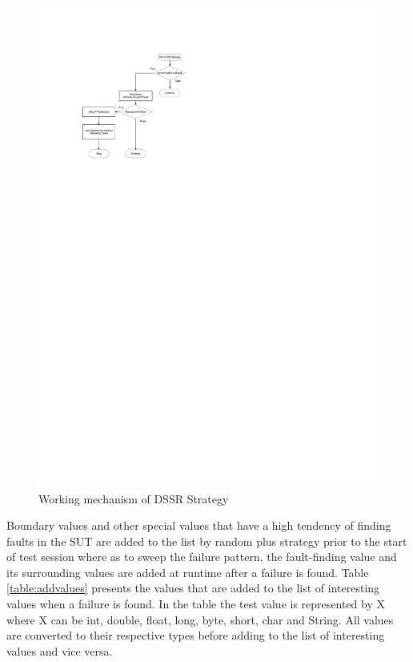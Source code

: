 \documentclass{acm_proc_article-sp}
\begin{document}
\begin{figure}[ht]
\centering
\includegraphics[width=\columnwidth]{flowchart1.pdf}
\caption{Working mechanism of DSSR Strategy}
\label{fig:Working_DSSS}
\end{figure}

Boundary values and other special values that have a high tendency of finding faults in the SUT are added to the list by random plus strategy prior to the start of test session where as to sweep the failure pattern, the fault-finding value and its surrounding values are added at runtime after a failure is found. Table \ref{table:addvalues} presents the values that are added to the list of interesting values when a failure is found. In the table the test value is represented by X where X can be int, double, float, long, byte, short, char and String. All values are converted to their respective types before adding to the list of interesting values and vice versa.
\end{document}
